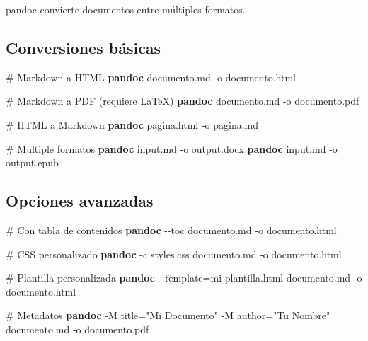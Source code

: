 \documentclass[
  11pt,
  letterpaper,
  oneside,
  openany]{scrbook}
\newenvironment{Shaded}{}{}
\newcommand{\AttributeTok}[1]{\textcolor[rgb]{0.84,0.23,0.29}{#1}}
\newcommand{\CommentTok}[1]{\textcolor[rgb]{0.42,0.45,0.49}{#1}}
\newcommand{\ExtensionTok}[1]{\textcolor[rgb]{0.84,0.23,0.29}{\textbf{#1}}}
\newcommand{\NormalTok}[1]{\textcolor[rgb]{0.14,0.16,0.18}{#1}}
\newcommand{\OperatorTok}[1]{\textcolor[rgb]{0.14,0.16,0.18}{#1}}
\newcommand{\StringTok}[1]{\textcolor[rgb]{0.01,0.18,0.38}{#1}}
\begin{document}
pandoc convierte documentos entre múltiples formatos.

\subsection{Conversiones básicas}\label{conversiones-buxe1sicas}

\begin{Shaded}
\begin{Highlighting}[]
\CommentTok{\# Markdown a HTML}
\ExtensionTok{pandoc}\NormalTok{ documento.md }\AttributeTok{{-}o}\NormalTok{ documento.html}

\CommentTok{\# Markdown a PDF (requiere LaTeX)}
\ExtensionTok{pandoc}\NormalTok{ documento.md }\AttributeTok{{-}o}\NormalTok{ documento.pdf}

\CommentTok{\# HTML a Markdown}
\ExtensionTok{pandoc}\NormalTok{ pagina.html }\AttributeTok{{-}o}\NormalTok{ pagina.md}

\CommentTok{\# Multiple formatos}
\ExtensionTok{pandoc}\NormalTok{ input.md }\AttributeTok{{-}o}\NormalTok{ output.docx}
\ExtensionTok{pandoc}\NormalTok{ input.md }\AttributeTok{{-}o}\NormalTok{ output.epub}
\end{Highlighting}
\end{Shaded}

\subsection{Opciones avanzadas}\label{opciones-avanzadas-1}

\begin{Shaded}
\begin{Highlighting}[]
\CommentTok{\# Con tabla de contenidos}
\ExtensionTok{pandoc} \AttributeTok{{-}{-}toc}\NormalTok{ documento.md }\AttributeTok{{-}o}\NormalTok{ documento.html}

\CommentTok{\# CSS personalizado}
\ExtensionTok{pandoc} \AttributeTok{{-}c}\NormalTok{ styles.css documento.md }\AttributeTok{{-}o}\NormalTok{ documento.html}

\CommentTok{\# Plantilla personalizada}
\ExtensionTok{pandoc} \AttributeTok{{-}{-}template}\OperatorTok{=}\NormalTok{mi{-}plantilla.html documento.md }\AttributeTok{{-}o}\NormalTok{ documento.html}

\CommentTok{\# Metadatos}
\ExtensionTok{pandoc} \AttributeTok{{-}M}\NormalTok{ title=}\StringTok{"Mi Documento"} \AttributeTok{{-}M}\NormalTok{ author=}\StringTok{"Tu Nombre"}\NormalTok{ documento.md }\AttributeTok{{-}o}\NormalTok{ documento.pdf}
\end{Highlighting}
\end{Shaded}
\end{document}
